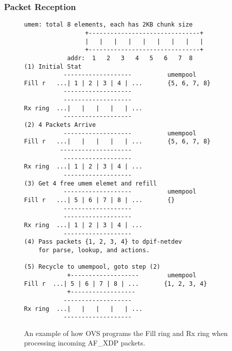 \documentclass[10pt]{sigplanconf}
\begin{document}
\subsubsection{Packet Reception}
\begin{figure}
{\scriptsize
\begin{verbatim}
umem: total 8 elements, each has 2KB chunk size
                 +-------------------------------+
                 |   |   |   |   |   |   |   |   |
                 +-------------------------------+
            addr:  1   2   3   4   5   6   7  8 
(1) Initial Stat
           -------------------          umempool
Fill r   ...| 1 | 2 | 3 | 4 | ...       {5, 6, 7, 8}
           -------------------
           -------------------
Rx ring  ...|   |   |   |   | ...
           -------------------
(2) 4 Packets Arrive
           -------------------          umempool
Fill r   ...|   |   |   |   | ...       {5, 6, 7, 8}
          --------------------
           -------------------
Rx ring  ...| 1 | 2 | 3 | 4 | ...
           -------------------
(3) Get 4 free umem elemet and refill
           -------------------          umempool
Fill r   ...| 5 | 6 | 7 | 8 | ...       {} 
           -------------------
           -------------------
Rx ring  ...| 1 | 2 | 3 | 4 | ...
           -------------------
(4) Pass packets {1, 2, 3, 4} to dpif-netdev
    for parse, lookup, and actions.

(5) Recycle to umempool, goto step (2)
            +-------------------        umempool
Fill r  ...| 5 | 6 | 7 | 8 | ...       {1, 2, 3, 4}
            +------------------
           -------------------
Rx ring  ...|   |   |   |   | ...
           -------------------
\end{verbatim}
}
\vspace{-1.0em}
\caption{An example of how OVS programs the Fill ring and Rx ring when
processing incoming AF\_XDP packets.}
\label{afxdprx}
\vspace{-1.0em}
\end{figure}
\end{document}
